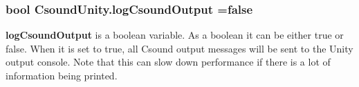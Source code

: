 \subsubsection[{log\+Csound\+Output}]{\setlength{\rightskip}{0pt plus 5cm}bool Csound\+Unity.\+log\+Csound\+Output =false}\label{class_csound_unity_a82c718d7b9393a4afb5d231e0bbef663}
{\bfseries log\+Csound\+Output} is a boolean variable. As a boolean it can be either true or false. When it is set to true, all Csound output messages will be sent to the Unity output console. Note that this can slow down performance if there is a lot of information being printed. 